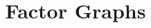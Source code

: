 \documentclass[journal,letterpaper,twocolumn,10pt,english]{IEEEtran}
\theoremstyle{plain}
\theoremstyle{definition}
\theoremstyle{remark}
\newcommand{\1}{\mathbb{I}}
\begin{document}
\title{Factor Graphs}


\end{document}
